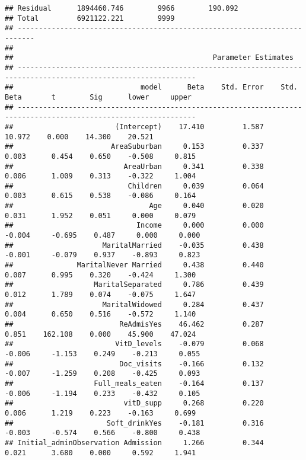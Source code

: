 \documentclass[
]{article}
\begin{document}
\begin{verbatim}
## Residual      1894460.746        9966        190.092                      
## Total         6921122.221        9999                                     
## --------------------------------------------------------------------------
## 
##                                               Parameter Estimates                                                
## ----------------------------------------------------------------------------------------------------------------
##                              model      Beta    Std. Error    Std. Beta       t        Sig      lower     upper 
## ----------------------------------------------------------------------------------------------------------------
##                        (Intercept)    17.410         1.587                  10.972    0.000    14.300    20.521 
##                       AreaSuburban     0.153         0.337        0.003      0.454    0.650    -0.508     0.815 
##                          AreaUrban     0.341         0.338        0.006      1.009    0.313    -0.322     1.004 
##                           Children     0.039         0.064        0.003      0.615    0.538    -0.086     0.164 
##                                Age     0.040         0.020        0.031      1.952    0.051     0.000     0.079 
##                             Income     0.000         0.000       -0.004     -0.695    0.487     0.000     0.000 
##                     MaritalMarried    -0.035         0.438       -0.001     -0.079    0.937    -0.893     0.823 
##               MaritalNever Married     0.438         0.440        0.007      0.995    0.320    -0.424     1.300 
##                   MaritalSeparated     0.786         0.439        0.012      1.789    0.074    -0.075     1.647 
##                     MaritalWidowed     0.284         0.437        0.004      0.650    0.516    -0.572     1.140 
##                         ReAdmisYes    46.462         0.287        0.851    162.108    0.000    45.900    47.024 
##                        VitD_levels    -0.079         0.068       -0.006     -1.153    0.249    -0.213     0.055 
##                         Doc_visits    -0.166         0.132       -0.007     -1.259    0.208    -0.425     0.093 
##                   Full_meals_eaten    -0.164         0.137       -0.006     -1.194    0.233    -0.432     0.105 
##                          vitD_supp     0.268         0.220        0.006      1.219    0.223    -0.163     0.699 
##                      Soft_drinkYes    -0.181         0.316       -0.003     -0.574    0.566    -0.800     0.438 
## Initial_adminObservation Admission     1.266         0.344        0.021      3.680    0.000     0.592     1.941 

\end{verbatim}
\end{document}
